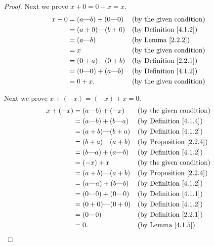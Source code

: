 \begin{proof}
    Next we prove \(x + 0 = 0 + x = x\).
    \begin{align*}
        x + 0 & = (a \text{---} b) + (0 \text{---} 0) &  & \text{(by the given condition)}    \\
              & = (a + 0) \text{---} (b + 0)          &  & \text{(by Definition \ref{4.1.2})} \\
              & = (a \text{---} b)                    &  & \text{(by Lemma \ref{2.2.2})}      \\
              & = x                                   &  & \text{(by the given condition)}    \\
              & = (0 + a) \text{---} (0 + b)          &  & \text{(by Definition \ref{2.2.1})} \\
              & = (0 \text{---} 0) + (a \text{---} b) &  & \text{(by Definition \ref{4.1.2})} \\
              & = 0 + x.                              &  & \text{(by the given condition)}
    \end{align*}

    Next we prove \(x + (-x) = (-x) + x = 0\).
    \begin{align*}
        x + (-x) & = (a \text{---} b) + (-x)             &  & \text{(by the given condition)}     \\
                 & = (a \text{---} b) + (b \text{---} a) &  & \text{(by Definition \ref{4.1.4})}  \\
                 & = (a + b) \text{---} (b + a)          &  & \text{(by Definition \ref{4.1.2})}  \\
                 & = (b + a) \text{---} (a + b)          &  & \text{(by Proposition \ref{2.2.4})} \\
                 & = (b \text{---} a) + (a \text{---} b) &  & \text{(by Definition \ref{4.1.2})}  \\
                 & = (-x) + x                            &  & \text{(by the given condition)}     \\
                 & = (a + b) \text{---} (a + b)          &  & \text{(by Proposition \ref{2.2.4})} \\
                 & = (a \text{---} a) + (b \text{---} b) &  & \text{(by Definition \ref{4.1.2})}  \\
                 & = (0 \text{---} 0) + (0 \text{---} 0) &  & \text{(by Definition \ref{4.1.1})}  \\
                 & = (0 + 0) \text{---} (0 + 0)          &  & \text{(by Definition \ref{4.1.2})}  \\
                 & = (0 \text{---} 0)                    &  & \text{(by Definition \ref{2.2.1})}  \\
                 & = 0.                                  &  & \text{(by Lemma \ref{4.1.5})}
    \end{align*}


\end{proof}
